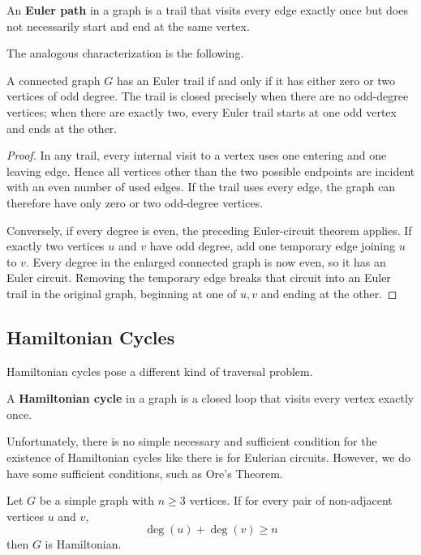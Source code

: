 \begin{definition}
An \textbf{Euler path} in a graph is a trail that visits every edge exactly once but does not necessarily start and end at the same vertex.
\end{definition}

The analogous characterization is the following.

\begin{theorem}
A connected graph $G$ has an Euler trail if and only if it has either zero or two vertices of odd degree. The trail is closed precisely when there are no odd-degree vertices; when there are exactly two, every Euler trail starts at one odd vertex and ends at the other.
\end{theorem}

\begin{proof}
In any trail, every internal visit to a vertex uses one entering and one leaving edge. Hence all vertices other than the two possible endpoints are incident with an even number of used edges. If the trail uses every edge, the graph can therefore have only zero or two odd-degree vertices.

Conversely, if every degree is even, the preceding Euler-circuit theorem applies. If exactly two vertices $u$ and $v$ have odd degree, add one temporary edge joining $u$ to $v$. Every degree in the enlarged connected graph is now even, so it has an Euler circuit. Removing the temporary edge breaks that circuit into an Euler trail in the original graph, beginning at one of $u,v$ and ending at the other.
\end{proof}

\subsection{Hamiltonian Cycles}

Hamiltonian cycles pose a different kind of traversal problem.

\begin{definition}
A \textbf{Hamiltonian cycle} in a graph is a closed loop that visits every vertex exactly once.
\end{definition}

Unfortunately, there is no simple necessary and sufficient condition for the existence of Hamiltonian cycles like there is for Eulerian circuits. However, we do have some sufficient conditions, such as Ore's Theorem.

\begin{theorem}
Let $G$ be a simple graph with $n \ge 3$ vertices. If for every pair of non-adjacent vertices $u$ and $v$,
\[ \deg(u) + \deg(v) \ge n \]
then $G$ is Hamiltonian.
\end{theorem}

